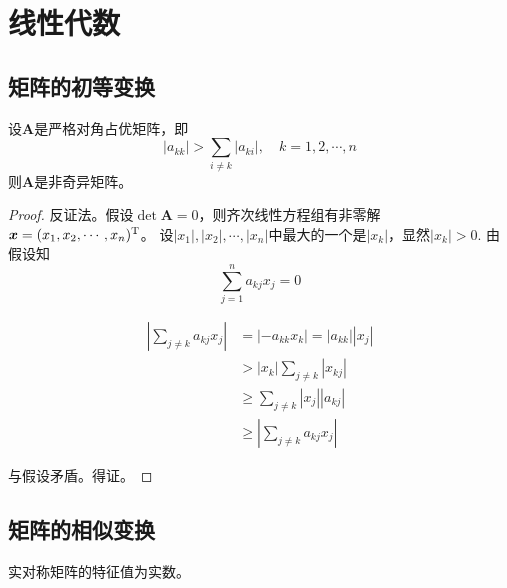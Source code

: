 \chapter{线性代数}

\section{矩阵的初等变换}

\begin{theorem}

    设$\boldsymbol{A}$是严格对角占优矩阵，即
    $$|a_{kk}| > \sum\limits_{i \neq k}{|a_{ki}|}, \quad k = 1, 2, \cdots , n$$
    则$\boldsymbol{A}$是非奇异矩阵。

\end{theorem}

\begin{proof}
    
    反证法。假设$\det \boldsymbol{A} = 0$，则齐次线性方程组有非零解$\boldsymbol{x} = (x_1, x_2, \cdots , x_n)^{\mathrm{T}}$。
    设$|x_1|, |x_2|, \cdots , |x_n|$中最大的一个是$|x_k|$，显然$|x_k| > 0$. 由假设知
    $$\sum\limits_{j = 1}^{n}{a_{kj}x_j}  = 0$$
    
    \begin{align*}
        \left| \sum\limits_{j \neq k}{a_{kj}x_j} \right| & = |-a_{kk}x_k| = |a_{kk}||x_j| \\ 
        & > |x_k| \sum\limits_{j \neq k}{|x_{kj}|} \\
        & \geq \sum\limits_{j \neq k}{|x_j||a_{kj}|} \\
        & \geq \left| \sum\limits_{j \neq k}{a_{kj}x_j} \right|
    \end{align*}

    与假设矛盾。得证。
    
\end{proof}

\section{矩阵的相似变换}

\begin{theorem}
    
    实对称矩阵的特征值为实数。

\end{theorem}

